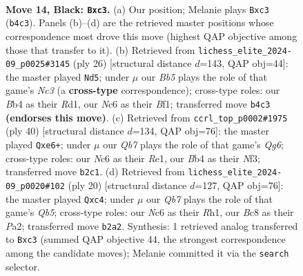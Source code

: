 \documentclass[11pt]{article}
\begin{document}
\clearpage

\begin{figure}[p]\centering
\begin{subfigure}{0.46\textwidth}\centering
\resizebox{\linewidth}{!}{%
\newchessgame
\chessboard[
  setfen={r1bk3r/pp3p1p/2n2N2/4p3/1b1p4/2PP1N2/Pq1Q1PPP/2R1K2R b K - 0 14},
  showmover=false,
  pgfstyle=straightmove, color=movearrow, markmove={b4-c3}
]}
\caption{}
\end{subfigure}\hfill
\begin{subfigure}{0.46\textwidth}\centering
\resizebox{\linewidth}{!}{%
\newchessgame
\chessboard[
  setfen={r2qk2r/pQp2pbp/5np1/8/2PpP3/2N5/PP2KP1P/3R1B1R w kq - 0 14},
  showmover=false,
  pgfstyle=straightmove, color=movearrow, markmove={c3-d5}
]}
\caption{}
\end{subfigure}
\\[4pt]
\begin{subfigure}{0.46\textwidth}\centering
\resizebox{\linewidth}{!}{%
\newchessgame
\chessboard[
  setfen={r2n1rk1/pp2p1b1/4q1Qp/3pPppP/3P4/2P2N2/P4PP1/R1B1R1K1 w - - 0 21},
  showmover=false,
  pgfstyle=straightmove, color=movearrow, markmove={g6-e6}
]}
\caption{}
\end{subfigure}\hfill
\begin{subfigure}{0.46\textwidth}\centering
\resizebox{\linewidth}{!}{%
\newchessgame
\chessboard[
  setfen={r3kb1r/pp1qpppp/5n2/1Qp5/2nP4/2P2N2/PP3PPP/R1B1K2R w KQkq - 0 11},
  showmover=false,
  pgfstyle=straightmove, color=movearrow, markmove={b5-c4}
]}
\caption{}
\end{subfigure}
\caption{\textbf{Move 14, Black: \texttt{Bxc3}.} (a) Our position; Melanie plays \texttt{Bxc3} (\texttt{b4c3}). Panels (b)--(d) are the retrieved master positions whose correspondence most drove this move (highest QAP objective among those that transfer to it). (b) Retrieved from \texttt{lichess\_elite\_2024-09\_p0025\#3145} (ply 26) [structural distance $d$=143, QAP obj=44]: the master played \texttt{Nd5}; under $\mu$ our \emph{Bb5} plays the role of that game's \emph{Nc3} (a \textbf{cross-type} correspondence); cross-type roles: our \emph{B}b4 as their \emph{R}d1, our \emph{N}c6 as their \emph{B}f1; transferred move \texttt{b4c3} \textbf{(endorses this move)}. (c) Retrieved from \texttt{ccrl\_top\_p0002\#1975} (ply 40) [structural distance $d$=134, QAP obj=76]: the master played \texttt{Qxe6+}; under $\mu$ our \emph{Qb7} plays the role of that game's \emph{Qg6}; cross-type roles: our \emph{N}c6 as their \emph{R}e1, our \emph{B}b4 as their \emph{N}f3; transferred move \texttt{b2c1}. (d) Retrieved from \texttt{lichess\_elite\_2024-09\_p0020\#102} (ply 20) [structural distance $d$=127, QAP obj=76]: the master played \texttt{Qxc4}; under $\mu$ our \emph{Qb7} plays the role of that game's \emph{Qb5}; cross-type roles: our \emph{N}c6 as their \emph{R}h1, our \emph{B}c8 as their \emph{P}a2; transferred move \texttt{b2a2}. Synthesis: 1 retrieved analog transferred to \texttt{Bxc3} (summed QAP objective 44, the strongest correspondence among the candidate moves); Melanie committed it via the \texttt{search} selector.}
\label{fig:thought-m27}
\end{figure}
\end{document}
